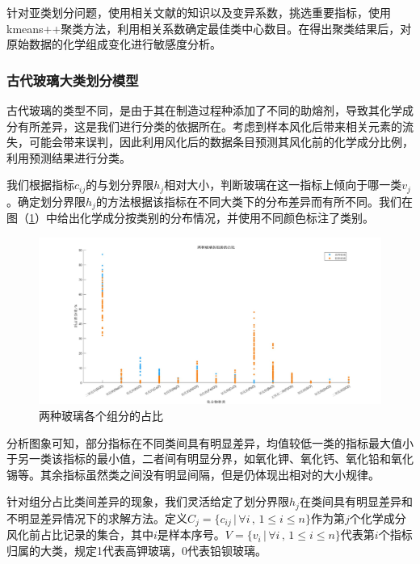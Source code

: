\documentclass{my_paper}
\begin{document}
针对亚类划分问题，使用相关文献的知识以及变异系数，挑选重要指标，使用kmeans++聚类方法，利用相关系数确定最佳类中心数目。在得出聚类结果后，对原始数据的化学组成变化进行敏感度分析。

\subsubsection{古代玻璃大类划分模型}
古代玻璃的类型不同，是由于其在制造过程种添加了不同的助熔剂，导致其化学成分有所差异，这是我们进行分类的依据所在。考虑到样本风化后带来相关元素的流失，可能会带来误判，因此利用风化后的数据条目预测其风化前的化学成分比例，利用预测结果进行分类。

我们根据指标$c_{ij}$的与划分界限$h_j$相对大小，判断玻璃在这一指标上倾向于哪一类$v_j$。确定划分界限$ h_j $的方法根据该指标在不同大类下的分布差异而有所不同。我们在图（\ref{hj}）中给出化学成分按类别的分布情况，并使用不同颜色标注了类别。
\begin {figure}[h]
\centering %
\includegraphics[width=\textwidth]{hj.jpg}
\caption{两种玻璃各个组分的占比} %
\label{hj}
\end {figure}
分析图象可知，部分指标在不同类间具有明显差异，均值较低一类的指标最大值小于另一类该指标的最小值，二者间有明显分界，如氧化钾、氧化钙、氧化铅和氧化锡等。其余指标虽然类之间没有明显间隔，但是仍体现出相对的大小规律。

针对组分占比类间差异的现象，我们灵活给定了划分界限$ h_j $在类间具有明显差异和不明显差异情况下的求解方法。定义$ C_j=\{c_{ij}\,|\,\forall i \,,\, 1\leq i \leq n\} $作为第$ j $个化学成分风化前占比记录的集合，其中$i$是样本序号。$ V=\{v_{i}\,|\,\forall i \,,\, 1\leq i \leq n\} $代表第$i$个指标归属的大类，规定1代表高钾玻璃，0代表铅钡玻璃。
\end{document}

